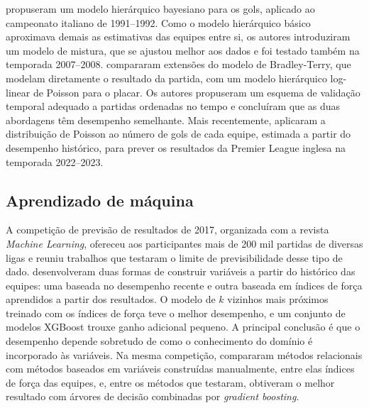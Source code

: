  propuseram um modelo hierárquico bayesiano para os gols, aplicado ao campeonato italiano de 1991--1992. Como o modelo hierárquico básico aproximava demais as estimativas das equipes entre si, os autores introduziram um modelo de mistura, que se ajustou melhor aos dados e foi testado também na temporada 2007--2008.  compararam extensões do modelo de Bradley-Terry, que modelam diretamente o resultado da partida, com um modelo hierárquico log-linear de Poisson para o placar. Os autores propuseram um esquema de validação temporal adequado a partidas ordenadas no tempo e concluíram que as duas abordagens têm desempenho semelhante. Mais recentemente,  aplicaram a distribuição de Poisson ao número de gols de cada equipe, estimada a partir do desempenho histórico, para prever os resultados da Premier League inglesa na temporada 2022--2023.

\subsection{Aprendizado de máquina}\label{subsec:RelML}

A competição de previsão de resultados de 2017, organizada com a revista \textit{Machine Learning}, ofereceu aos participantes mais de 200 mil partidas de diversas ligas e reuniu trabalhos que testaram o limite de previsibilidade desse tipo de dado.  desenvolveram duas formas de construir variáveis a partir do histórico das equipes: uma baseada no desempenho recente e outra baseada em índices de força aprendidos a partir dos resultados. O modelo de $k$ vizinhos mais próximos treinado com os índices de força teve o melhor desempenho, e um conjunto de modelos XGBoost trouxe ganho adicional pequeno. A principal conclusão é que o desempenho depende sobretudo de como o conhecimento do domínio é incorporado às variáveis. Na mesma competição,  compararam métodos relacionais com métodos baseados em variáveis construídas manualmente, entre elas índices de força das equipes, e, entre os métodos que testaram, obtiveram o melhor resultado com árvores de decisão combinadas por \textit{gradient boosting}.

